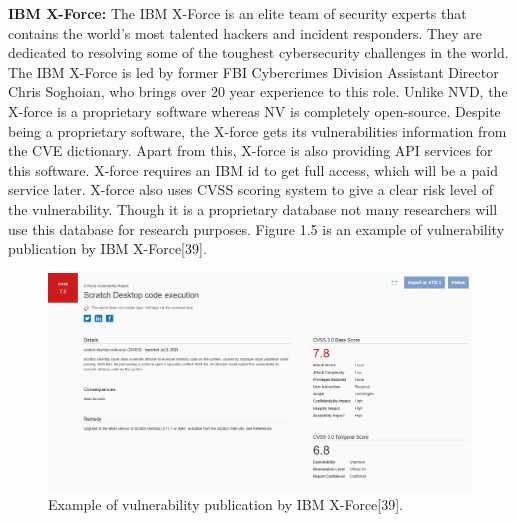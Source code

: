 {\bf IBM X-Force:} The IBM X-Force is an elite team of security experts that contains the world's most talented hackers and incident responders. They are dedicated to resolving some of the toughest cybersecurity challenges in the world. The IBM X-Force is led by former FBI Cybercrimes Division Assistant Director Chris Soghoian, who brings over 20 year experience to this role. Unlike NVD, the X-force is a proprietary software whereas NV is completely open-source. Despite being a proprietary software, the X-force gets its vulnerabilities information from the CVE dictionary. Apart from this, X-force is also providing API services for this software. X-force requires an IBM id to get full access, which will be a paid service later. X-force also uses CVSS scoring system to give a clear risk level of the vulnerability. Though it is a proprietary database not many researchers will use this database for research purposes. Figure 1.5 is an example of vulnerability publication by IBM X-Force[39].
\newpage
\begin{figure}[h!]
	\includegraphics[width=15cm]{includes/ibm.png}
	\centering
	\caption{Example of vulnerability publication by IBM X-Force[39].}
	\label{fig:ibm}
\end{figure}

